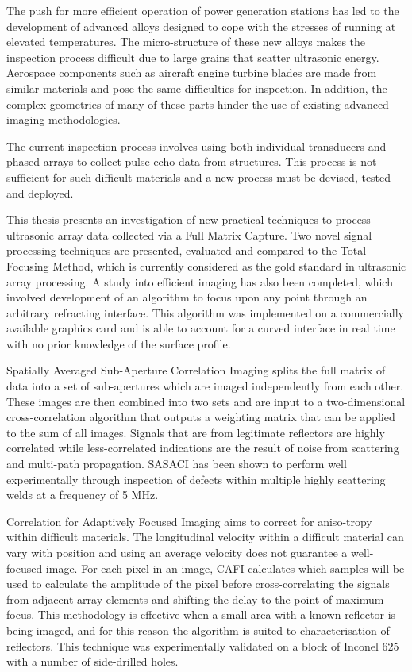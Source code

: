 

\begin{abstracts}   
\onehalfspacing
The push for more efficient operation of power generation stations has led to the development of advanced alloys designed to cope with the stresses of running at elevated temperatures. The micro-structure of these new alloys makes the inspection process difficult due to large grains that scatter ultrasonic energy. Aerospace components such as aircraft engine turbine blades are made from similar materials and pose the same difficulties for inspection. In addition, the complex geometries of many of these parts hinder the use of existing advanced imaging methodologies. 

The current inspection process involves using both individual transducers and phased arrays to collect pulse-echo data from structures. This process is not sufficient for such difficult materials and a new process must be devised, tested and deployed.

This thesis presents an investigation of new practical techniques to process ultrasonic array data collected via a Full Matrix Capture.  Two novel signal processing techniques are presented, evaluated and compared to the Total Focusing Method, which is currently considered as the gold standard in ultrasonic array processing. A study into efficient imaging has also been completed, which involved development of an algorithm to focus upon any point through an arbitrary refracting interface. This algorithm was implemented on a commercially available graphics card and is able to account for a curved interface in real time with no prior knowledge of the surface profile.

Spatially Averaged Sub-Aperture Correlation Imaging splits the full matrix of data into a set of sub-apertures which are imaged independently from each other. These images are then combined into two sets and are input to a two-dimensional cross-correlation algorithm that outputs a weighting matrix that can be applied to the sum of all images. Signals that are from legitimate reflectors are highly correlated while less-correlated indications are the result of noise from scattering and multi-path propagation. SASACI has been shown to perform well experimentally through inspection of defects within multiple highly scattering welds at a frequency of 5 MHz.

Correlation for Adaptively Focused Imaging aims to correct for aniso-tropy within difficult materials. The longitudinal velocity within a difficult material can vary with position and using an average velocity does not guarantee a well-focused image. For each pixel in an image, CAFI calculates which samples will be used to calculate the amplitude of the pixel before cross-correlating the signals from adjacent array elements and shifting the delay to the point of maximum focus. This methodology is effective when a small area with a known reflector is being imaged, and for this reason the algorithm is suited to characterisation of reflectors. This technique was experimentally validated on a block of Inconel 625 with a number of side-drilled holes.
\end{abstracts}




